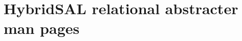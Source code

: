 \documentclass{llncs}
\begin{document}
%
%
%
%
%








\appendix
\section{HybridSAL relational abstracter man pages}
\label{app:1}
\end{document}
